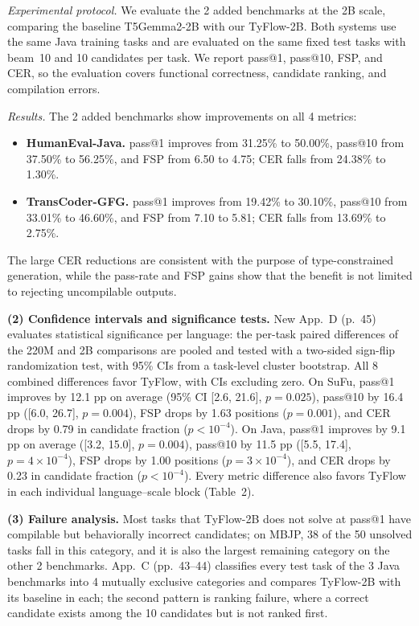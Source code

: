 \documentclass[11pt,a4paper]{article}
\begin{document}
\emph{Experimental protocol.} We evaluate the 2 added benchmarks at the 2B scale, comparing the baseline T5Gemma2-2B with our TyFlow-2B. Both systems use the same Java training tasks and are evaluated on the same fixed test tasks with beam~10 and 10 candidates per task. We report pass@1, pass@10, FSP, and CER, so the evaluation covers functional correctness, candidate ranking, and compilation errors.

\emph{Results.} The 2 added benchmarks show improvements on all 4 metrics:
\begin{itemize}[leftmargin=1.4em]
  \item \textbf{HumanEval-Java.} pass@1 improves from 31.25\% to 50.00\%, pass@10 from 37.50\% to 56.25\%, and FSP from 6.50 to 4.75; CER falls from 24.38\% to 1.30\%.
  \item \textbf{TransCoder-GFG.} pass@1 improves from 19.42\% to 30.10\%, pass@10 from 33.01\% to 46.60\%, and FSP from 7.10 to 5.81; CER falls from 13.69\% to 2.75\%.
\end{itemize}
The large CER reductions are consistent with the purpose of type-constrained generation, while the pass-rate and FSP gains show that the benefit is not limited to rejecting uncompilable outputs.

\textbf{(2) Confidence intervals and significance tests.} New App.~D (p.~45) evaluates statistical significance per language: the per-task paired differences of the 220M and 2B comparisons are pooled and tested with a two-sided sign-flip randomization test, with 95\% CIs from a task-level cluster bootstrap. All 8 combined differences favor TyFlow, with CIs excluding zero. On SuFu, pass@1 improves by 12.1 pp on average (95\% CI [2.6, 21.6], $p=0.025$), pass@10 by 16.4 pp ([6.0, 26.7], $p=0.004$), FSP drops by 1.63 positions ($p=0.001$), and CER drops by 0.79 in candidate fraction ($p<10^{-4}$). On Java, pass@1 improves by 9.1 pp on average ([3.2, 15.0], $p=0.004$), pass@10 by 11.5 pp ([5.5, 17.4], $p=4{\times}10^{-4}$), FSP drops by 1.00 positions ($p=3{\times}10^{-4}$), and CER drops by 0.23 in candidate fraction ($p<10^{-4}$). Every metric difference also favors TyFlow in each individual language--scale block (Table~2).

\textbf{(3) Failure analysis.} Most tasks that TyFlow-2B does not solve at pass@1 have compilable but behaviorally incorrect candidates; on MBJP, 38 of the 50 unsolved tasks fall in this category, and it is also the largest remaining category on the other 2 benchmarks. App.~C (pp.~43--44) classifies every test task of the 3 Java benchmarks into 4 mutually exclusive categories and compares TyFlow-2B with its baseline in each; the second pattern is ranking failure, where a correct candidate exists among the 10 candidates but is not ranked first.
\end{document}
